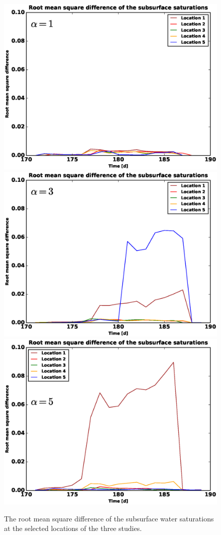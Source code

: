 \documentclass[review]{elsarticle}
\begin{document}
\begin{figure}[!htpb]
\centering
\includegraphics[height = 6.cm, width=10.cm]{figures/comparison/regular/error.eps}
\includegraphics[height = 6.cm, width=10.cm]{figures/comparison/dist/Elev-grad1.5m/error.eps}
\includegraphics[height = 6.cm, width=10.cm]{figures/comparison/dist/Elev-grad2.5m/error.eps}
\caption{The root mean square difference of the subsurface water saturations at the selected locations of the three studies.}
\label{error-plots}
\end{figure}


\end{document}

